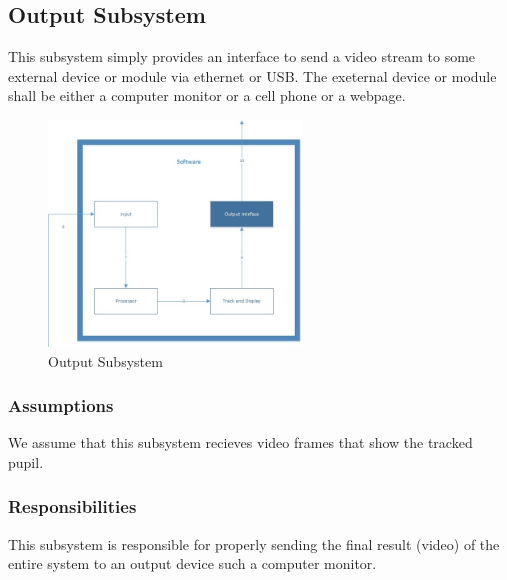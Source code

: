 \subsection{Output Subsystem}
This subsystem simply provides an interface to send a video stream to some external device or module via ethernet or USB. The exeternal device or module shall be either a computer monitor or a cell phone or a webpage. 


\begin{figure}[h!]
	\centering
 	\includegraphics[width=0.60\textwidth]{images/Software_Output.jpg}
 \caption{Output Subsystem}
\end{figure}

\subsubsection{Assumptions}
We assume that this subsystem recieves video frames that show the tracked pupil. 

\subsubsection{Responsibilities}
This subsystem is responsible for properly sending the final result (video) of the entire system to an output device such a computer monitor. 

